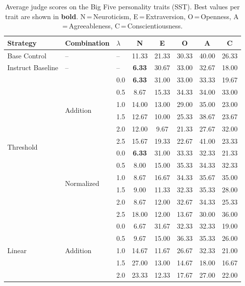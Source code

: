 \begin{table}[htbp]
  \centering
  \caption{Average judge scores on the Big Five personality traits (SST). Best values per trait are shown in \textbf{bold}. N\,=\,Neuroticism, E\,=\,Extraversion, O\,=\,Openness, A\,=\,Agreeableness, C\,=\,Conscientiousness.}
  \label{tab:sst_scores}
  \small
  \begin{tabular}{lll ccccc}
    \toprule
    Strategy & Combination & $\lambda$ & N & E & O & A & C \\
    \midrule
    Base Control & -- & -- & 11.33 & 21.33 & 30.33 & 40.00 & 26.33 \\
    Instruct Baseline & -- & -- & \textbf{6.33} & 30.67 & 33.00 & 32.67 & 18.00 \\
    \midrule
    \multirow{12}{*}{Threshold} & \multirow{6}{*}{Addition} & 0.0 & \textbf{6.33} & 31.00 & 33.00 & 33.33 & 19.67 \\
     &  & 0.5 & 8.67 & 15.33 & 34.33 & 34.00 & 33.00 \\
     &  & 1.0 & 14.00 & 13.00 & 29.00 & 35.00 & 23.00 \\
     &  & 1.5 & 12.67 & 10.00 & 25.33 & 38.67 & 23.67 \\
     &  & 2.0 & 12.00 & 9.67 & 21.33 & 27.67 & 32.00 \\
     &  & 2.5 & 15.67 & 19.33 & 22.67 & 41.00 & 23.33 \\
    \cmidrule(lr){2-8}
     & \multirow{6}{*}{Normalized} & 0.0 & \textbf{6.33} & 31.00 & 33.33 & 32.33 & 21.33 \\
     &  & 0.5 & 8.00 & 15.00 & 35.33 & 34.33 & 32.33 \\
     &  & 1.0 & 8.67 & 16.67 & 34.33 & 35.67 & 35.00 \\
     &  & 1.5 & 9.00 & 11.33 & 32.33 & 35.33 & 28.00 \\
     &  & 2.0 & 8.67 & 12.00 & 32.67 & 34.33 & 25.33 \\
     &  & 2.5 & 18.00 & 12.00 & 13.67 & 30.00 & 36.00 \\
    \midrule
    \multirow{12}{*}{Linear} & \multirow{6}{*}{Addition} & 0.0 & 6.67 & 31.67 & 32.33 & 32.33 & 19.00 \\
     &  & 0.5 & 9.67 & 15.00 & 36.33 & 35.33 & 26.00 \\
     &  & 1.0 & 14.67 & 11.67 & 26.67 & 32.33 & 21.00 \\
     &  & 1.5 & 27.00 & 13.00 & 14.67 & 18.00 & 16.67 \\
     &  & 2.0 & 23.33 & 12.33 & 17.67 & 27.00 & 22.00 \\

\end{tabular}
\end{table}
